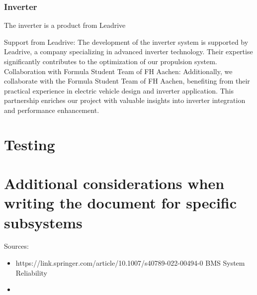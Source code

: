 \subsubsection{Inverter}
The inverter is a product from Leadrive 

    Support from Leadrive: The development of the inverter system is supported by Leadrive, a company specializing in advanced inverter technology. Their expertise significantly contributes to the optimization of our propulsion system.
    Collaboration with Formula Student Team of FH Aachen: Additionally, we collaborate with the Formula Student Team of FH Aachen, benefiting from their practical experience in electric vehicle design and inverter application. This partnership enriches our project with valuable insights into inverter integration and performance enhancement.

\section{Testing}



\section{Additional considerations when writing the document for specific subsystems}
Sources:
\begin{itemize}
    \item https://link.springer.com/article/10.1007/s40789-022-00494-0 BMS System Reliability
    \item 
\end{itemize}


\begin{comment}





\end{comment}

\newpage